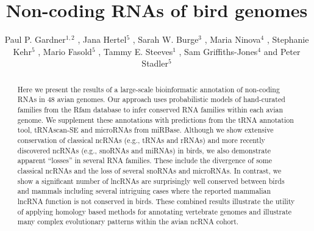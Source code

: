 \documentclass[10pt]{bmc_article}
\newenvironment{bmcformat}{\begin{raggedright}\baselineskip20pt\sloppy\setboolean{publ}{false}}{\end{raggedright}\baselineskip20pt\sloppy}
\begin{document}
\begin{bmcformat}

\title{Non-coding RNAs of bird genomes}

\author{
Paul P. Gardner\correspondingauthor$^{1,2}$
,
Jana Hertel$^5$
,
Sarah W. Burge$^3$
,
Maria Ninova$^4$
,
Stephanie Kehr$^5$
,
Mario Fasold$^5$
,
Tammy E. Steeves$^1$
,
Sam Griffiths-Jones$^4$
and
Peter Stadler\correspondingauthor$^5$
}
\address{
\iid(1) School of Biological Sciences, University of Canterbury, Private Bag 4800, Christchurch, New Zealand.
\iid(2) Biomolecular Interaction Centre, University of Canterbury, Private Bag 4800, Christchurch, New Zealand.
\iid(3) European Molecular Biology Laboratory, European Bioinformatics Institute, Hinxton, Cambridge, CB10 1SD, UK.
\iid(4) Faculty of Life Sciences, University of Manchester, Manchester, United Kingdom.
\iid(5) Bioinformatics Group, Department of Computer Science; and Interdisciplinary Center for Bioinformatics, University of Leipzig, H{\"a}rtelstrasse 16-18, D-04107 Leipzig, Germany
}

\maketitle

\begin{abstract}
Here we present the results of a large-scale bioinformatic annotation
of non-coding RNAs in 48 avian genomes. Our approach uses
probabilistic models of hand-curated families from the Rfam database
to infer conserved RNA families within each avian genome. We
supplement these annotations with predictions from the tRNA annotation
tool, tRNAscan-SE and microRNAs from miRBase. Although we show
extensive conservation of classical ncRNAs (e.g., tRNAs and rRNAs) and
more recently discovered ncRNAs (e.g., snoRNAs and miRNAs) in birds,
we also demonstrate apparent ``losses'' in several RNA families. These
include the divergence of some classical ncRNAs and the loss of
several snoRNAs and microRNAs. In contrast, we show a significant
number of lncRNAs are surprisingly well conserved between birds and
mammals including several intriguing cases where the reported
mammalian lncRNA function is not conserved in birds. These combined
results illustrate the utility of applying homology based methods for
annotating vertebrate genomes and illustrate many complex evolutionary
patterns within the avian ncRNA cohort.
\end{abstract}


\end{bmcformat}
\end{document}
